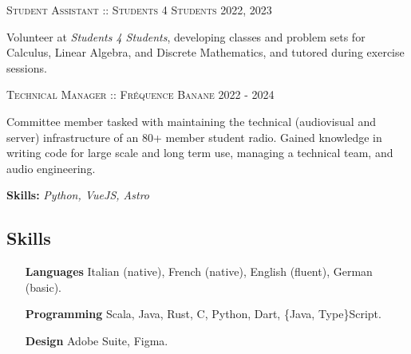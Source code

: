 \documentclass[11pt]{article}
\renewcommand{\line}[2]{{\vspace{4pt} \large \noindent\textsc{#1} \hfill \small{#2}}\vspace{0pt}}
\begin{document}
  \line{Student Assistant :: Students 4 Students}{2022, 2023}

  Volunteer at \textit{Students 4 Students}, developing classes and problem sets for Calculus, Linear Algebra, and Discrete Mathematics, and tutored during exercise sessions.
  \vspace{0.75em}

  \line{Technical Manager :: Fréquence Banane}{2022 - 2024}

  Committee member tasked with maintaining the technical (audiovisual and server) infrastructure of an 80+ member student radio. Gained knowledge in writing code for large scale and long term use, managing a technical team, and audio engineering.

  \textbf{Skills:} \textit{Python, VueJS, Astro}
  \subsection*{Skills}

  \begin{adjustwidth}{6em}{}
    \begin{itemize}
      \item[\textbf{Languages}] Italian (native), French (native), English (fluent), German (basic).
      \item[\textbf{Programming}] Scala, Java, Rust, C, Python, Dart, \{Java, Type\}Script.
      \item[\textbf{Design}] Adobe Suite, Figma.
    \end{itemize}
  \end{adjustwidth}
\end{document}
